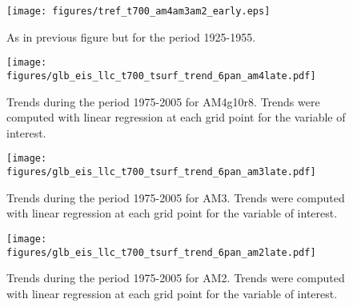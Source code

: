 \documentclass[grl]{agutex2015}
\begin{document}
\begin{figure}
  \texttt{[image: figures/tref\_t700\_am4am3am2\_early.eps]}
  \caption{As in previous figure but for the period 1925-1955.}
  \label{fig:tref_t700_early}
\end{figure}

\begin{figure}
  \texttt{[image: figures/glb\_eis\_llc\_t700\_tsurf\_trend\_6pan\_am4late.pdf]}
  \caption{Trends during the period 1975-2005 for AM4g10r8.  Trends were computed with linear regression at each grid point for the variable of interest.}
  \label{fig:lcceisapp_am4}
\end{figure} 

\begin{figure}
  \texttt{[image: figures/glb\_eis\_llc\_t700\_tsurf\_trend\_6pan\_am3late.pdf]}
  \caption{Trends during the period 1975-2005 for AM3.  Trends were computed with linear regression at each grid point for the variable of interest.}
  \label{fig:lcceisapp_am3}
\end{figure}

\begin{figure}
  \texttt{[image: figures/glb\_eis\_llc\_t700\_tsurf\_trend\_6pan\_am2late.pdf]}
  \caption{Trends during the period 1975-2005 for AM2.  Trends were computed with linear regression at each grid point for the variable of interest.}
  \label{fig:lcceisapp_am2}
\end{figure}
\end{document}
